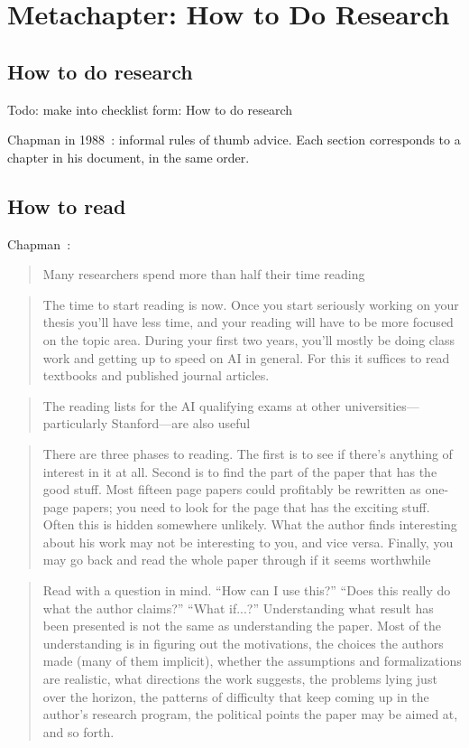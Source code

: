 \chapter{Metachapter: How to Do Research}

\section{How to do research}
Todo: make into checklist form: How to do research \cite{chapman1988how}
\cite{hwang2008how}
\cite{desjardins2008how}

Chapman in 1988~\cite{chapman1988how}: informal rules of thumb advice. Each
section corresponds to a chapter in his document, in the same order.


\section{How to read}

Chapman~\cite{chapman1988how}:
\blockquote{Many researchers spend more than half their time reading}

\blockquote{The time to start reading is now. Once you start seriously working
on your thesis you’ll have less time, and your reading will have to be more
focused on the topic area. During your first two years, you’ll mostly be doing
class work and getting up to speed on AI in general. For this it suffices to
read textbooks and published journal articles.}

\blockquote{The reading lists for the AI qualifying exams at other
universities—particularly Stanford—are also useful}

\blockquote{There are three phases to reading. The
first is to see if there’s anything of interest in it at all. Second is to find
the part of the paper that has the good stuff. Most fifteen page papers could
profitably be rewritten as one-page papers; you need to look for the page that
has the exciting stuff. Often this is hidden somewhere unlikely. What the author
finds interesting about his work may not be interesting to you, and vice versa.
Finally, you may go back and read the whole paper through if it seems
worthwhile}

\blockquote{Read with a question in mind. “How can I use this?” “Does this really do
what the author claims?” “What if...?” Understanding what result has been presented
is not the same as understanding the paper. Most of the understanding
is in figuring out the motivations, the choices the authors made (many of them
implicit), whether the assumptions and formalizations are realistic, what directions
the work suggests, the problems lying just over the horizon, the patterns
of difficulty that keep coming up in the author’s research program, the political
points the paper may be aimed at, and so forth.}

